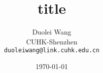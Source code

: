 \title{title}
\author{
  Duolei Wang\\
  CUHK-Shenzhen\\
  \texttt{duoleiwang@link.cuhk.edu.cn}\\
}
\date{\today}